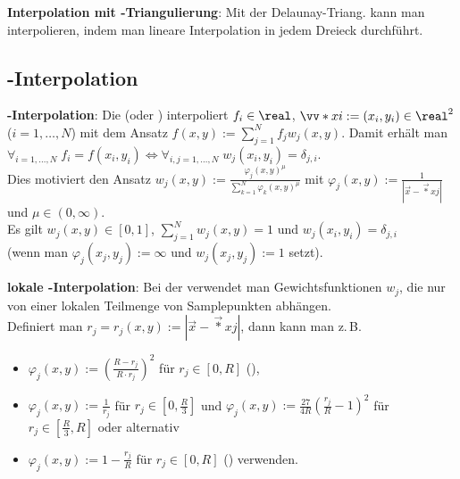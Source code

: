 \textbf{Interpolation mit -Triangulierung}:
Mit der Delaunay-Triang. kann man interpolieren,
indem man lineare Interpolation in jedem Dreieck durchführt.

\subsection{%
    -Interpolation%
}

\textbf{-Interpolation}:
Die  (oder )
interpoliert $f_i \in \real$, $\vec*{x}{i} := (x_i, y_i) \in \real^2$ ($i = 1, \dotsc, N$)
mit dem Ansatz $f(x, y) := \sum_{j=1}^N f_j w_j(x, y)$.
Damit erhält man $\forall_{i=1,\dotsc,N}\; f_i = f(x_i, y_i) \iff
\forall_{i,j=1,\dotsc,N}\; w_j(x_i, y_i) = \delta_{j,i}$.\\
Dies motiviert den Ansatz
$w_j(x, y) := \frac{\varphi_j(x, y)^\mu}{\sum_{k=1}^N \varphi_k(x, y)^\mu}$ mit
$\varphi_j(x, y) := \frac{1}{|\vec{x} - \vec*{x}{j}|}$ und $\mu \in (0, \infty)$.\\
Es gilt $w_j(x, y) \in [0, 1]$, $\sum_{j=1}^N w_j(x, y) = 1$ und $w_j(x_i, y_i) = \delta_{j,i}$\\
(wenn man $\varphi_j(x_j, y_j) := \infty$ und $w_j(x_j, y_j) := 1$ setzt).

\linie

\textbf{lokale -Interpolation}:
Bei der  verwendet man
Gewichtsfunktionen $w_j$, die nur von einer lokalen Teilmenge von Samplepunkten abhängen.\\
Definiert man $r_j = r_j(x, y) := |\vec{x} - \vec*{x}{j}|$, dann
kann man z.\,B.
\begin{itemize}
    \item
    $\varphi_j(x, y) := \left(\frac{R - r_j}{R \cdot r_j}\right)^2$ für $r_j \in [0, R]$
    (),
    
    \item
    $\varphi_j(x, y) := \frac{1}{r_j}$ für $r_j \in [0, \frac{R}{3}]$ und
    $\varphi_j(x, y) := \frac{27}{4R} \left(\frac{r_j}{R} - 1\right)^2$ für
    $r_j \in [\frac{R}{3}, R]$ oder alternativ
    
    \item
    $\varphi_j(x, y) := 1 - \frac{r_j}{R}$ für $r_j \in [0, R]$
    () verwenden.
\end{itemize}

